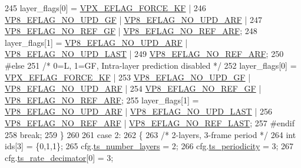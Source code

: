 \begin{DoxyCodeInclude}
{{{{{{{{{{{{{{{245         layer\_flags[0] = \hyperlink{group__encoder_ga4c4f4e3cbb5225d2c6c050e2d1e948fa}{VPX\_EFLAG\_FORCE\_KF}  |
246                          \hyperlink{group__vp8__encoder_gab01d066c5236457d345ce1cab4c41d6b}{VP8\_EFLAG\_NO\_UPD\_GF} | 
      \hyperlink{group__vp8__encoder_ga1cff46a5287e73a620660030d40b9e6c}{VP8\_EFLAG\_NO\_UPD\_ARF} |
247                          \hyperlink{group__vp8__encoder_gabb5e95343a2738abef44eca13059da33}{VP8\_EFLAG\_NO\_REF\_GF} | 
      \hyperlink{group__vp8__encoder_ga650ab0baea12be91082226a5cc18776a}{VP8\_EFLAG\_NO\_REF\_ARF};
248         layer\_flags[1] = \hyperlink{group__vp8__encoder_ga1cff46a5287e73a620660030d40b9e6c}{VP8\_EFLAG\_NO\_UPD\_ARF} | 
      \hyperlink{group__vp8__encoder_ga602edb6b02a89cb2db7a16d6dffba583}{VP8\_EFLAG\_NO\_UPD\_LAST} |
249                          \hyperlink{group__vp8__encoder_ga650ab0baea12be91082226a5cc18776a}{VP8\_EFLAG\_NO\_REF\_ARF};
250 \textcolor{preprocessor}{#else}
251         \textcolor{comment}{/* 0=L, 1=GF, Intra-layer prediction disabled */}
252         layer\_flags[0] = \hyperlink{group__encoder_ga4c4f4e3cbb5225d2c6c050e2d1e948fa}{VPX\_EFLAG\_FORCE\_KF}  |
253                          \hyperlink{group__vp8__encoder_gab01d066c5236457d345ce1cab4c41d6b}{VP8\_EFLAG\_NO\_UPD\_GF} | 
      \hyperlink{group__vp8__encoder_ga1cff46a5287e73a620660030d40b9e6c}{VP8\_EFLAG\_NO\_UPD\_ARF} |
254                          \hyperlink{group__vp8__encoder_gabb5e95343a2738abef44eca13059da33}{VP8\_EFLAG\_NO\_REF\_GF} | 
      \hyperlink{group__vp8__encoder_ga650ab0baea12be91082226a5cc18776a}{VP8\_EFLAG\_NO\_REF\_ARF};
255         layer\_flags[1] = \hyperlink{group__vp8__encoder_ga1cff46a5287e73a620660030d40b9e6c}{VP8\_EFLAG\_NO\_UPD\_ARF} | 
      \hyperlink{group__vp8__encoder_ga602edb6b02a89cb2db7a16d6dffba583}{VP8\_EFLAG\_NO\_UPD\_LAST} |
256                          \hyperlink{group__vp8__encoder_ga650ab0baea12be91082226a5cc18776a}{VP8\_EFLAG\_NO\_REF\_ARF} | 
      \hyperlink{group__vp8__encoder_gafb51c67e5743275146bc1fc425727da3}{VP8\_EFLAG\_NO\_REF\_LAST};
257 \textcolor{preprocessor}{#endif}
258         \textcolor{keywordflow}{break};
259     \}
260 
261     \textcolor{keywordflow}{case} 2:
262     \{
263         \textcolor{comment}{/* 2-layers, 3-frame period */}
264         \textcolor{keywordtype}{int} ids[3] = \{0,1,1\};
265         cfg.\hyperlink{structvpx__codec__enc__cfg_a16d4549a30cbd585e3c3056ef873d8c7}{ts\_number\_layers}     = 2;
266         cfg.\hyperlink{structvpx__codec__enc__cfg_a4ec338780115dd270acf0dac24193474}{ts\_periodicity}       = 3;
267         cfg.\hyperlink{structvpx__codec__enc__cfg_ad40c30846ef8ef1d8684f10a491ec535}{ts\_rate\_decimator}[0] = 3;
}}}}}}}}}}}}}}}
\end{DoxyCodeInclude}
